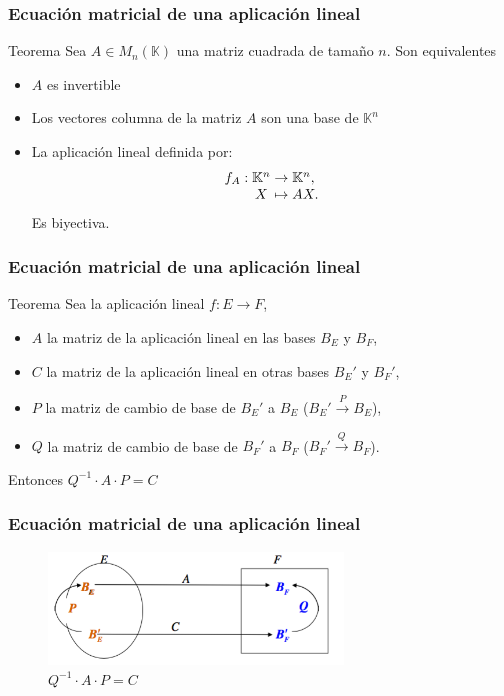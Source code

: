 \documentclass{beamer}
\begin{document}
    \begin{frame}
  \frametitle{Ecuaci\'on matricial de una aplicaci\'on lineal}
\begin{block}{Teorema}
Sea $A\in M_n(\mathbb K)$ una matriz cuadrada de tama\~no $n$. Son equivalentes
\begin{itemize}
\item $A$ es invertible
\item Los vectores columna de la matriz $A$ son una base de $\mathbb K^n$ 
\item La aplicaci\'on lineal definida por: 
\[
  \begin{array}{@{}r@{\;}c@{\;}c@{\;}l@{}}
    f_A: & \mathbb K^n & \rightarrow & \mathbb K^n,   \\
       & X & \mapsto     & AX.
  \end{array}
\] 
Es biyectiva. 
\end{itemize}
\end{block}
 \end{frame}    
 
     \begin{frame}
  \frametitle{Ecuaci\'on matricial de una aplicaci\'on lineal}
\begin{block}{Teorema}
Sea la aplicaci\'on lineal  $f:E\longrightarrow F$, 
\begin{itemize}
\item $A$ la matriz de la aplicaci\'on lineal en las bases $B_E$ y $B_F$, 
\item $C$ la matriz de la aplicaci\'on lineal en otras bases $B_E'$ y $B_F'$, 
\item $P$ la matriz de cambio de base de $B_E'$ a $B_E$ ($B_E'\xrightarrow{P}B_E$),
\item $Q$ la matriz de cambio de base de $B_F'$ a $B_F$ ($B_F'\xrightarrow{Q}B_F$).
\end{itemize}
Entonces $Q^{-1}\cdot A \cdot P = C$

\end{block}
 \end{frame}    
 
  
\begin{frame}
\frametitle{Ecuaci\'on matricial de una aplicaci\'on lineal}
\begin{figure}[h]
\label{fig:volumen}
\caption{$Q^{-1}\cdot A \cdot P = C$}
\centering
\includegraphics[height=3cm]{canvi}
\end{figure}
 \end{frame}   
 
\end{document}
